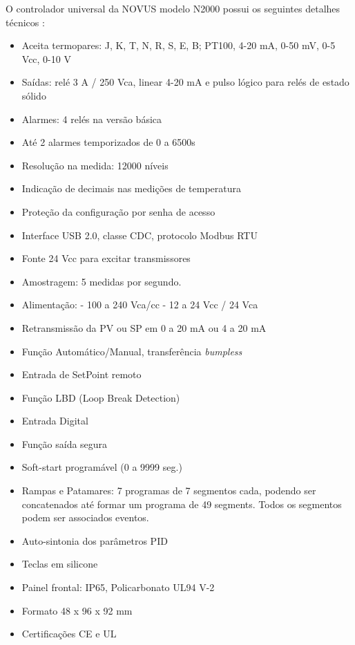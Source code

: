 O controlador universal da NOVUS modelo N2000 possui os seguintes detalhes técnicos \cite{novus2014folheto}:
\begin{itemize}

    \item Aceita termopares: J, K, T, N, R, S, E, B; PT100, 4-20 mA, 0-50 mV, 0-5 Vcc, 0-10 V
    \item Saídas: relé 3 A / 250 Vca, linear 4-20 mA e pulso lógico para relés de estado sólido 
    \item Alarmes: 4 relés na versão básica 
    \item Até 2 alarmes temporizados de 0 a 6500s 
    \item Resolução na medida: 12000 níveis 
    \item Indicação de decimais nas medições de temperatura
    \item Proteção da configuração por senha de acesso
    \item Interface USB 2.0, classe CDC, protocolo Modbus RTU
    \item Fonte 24 Vcc para excitar transmissores
    \item Amostragem: 5 medidas por segundo.
    \item Alimentação: 
    - 100 a 240 Vca/cc 
    - 12 a 24 Vcc / 24 Vca 
    \item Retransmissão da PV ou SP em 0 a 20 mA ou 4 a 20 mA
    \item Função Automático/Manual, transferência \textit{bumpless}
    \item Entrada de SetPoint remoto
    \item Função LBD (Loop Break Detection)
    \item Entrada Digital
    \item Função saída segura
    \item Soft-start programável (0 a 9999 seg.)
    \item Rampas e Patamares: 7 programas de 7 segmentos cada, podendo ser concatenados até formar um programa de 49 segments. Todos os segmentos podem ser associados eventos.
    \item Auto-sintonia dos parâmetros PID
    \item Teclas em silicone 
    \item Painel frontal: IP65, Policarbonato UL94 V-2
    \item Formato 48 x 96 x 92 mm
    \item Certificações CE e UL
    
\end{itemize}

